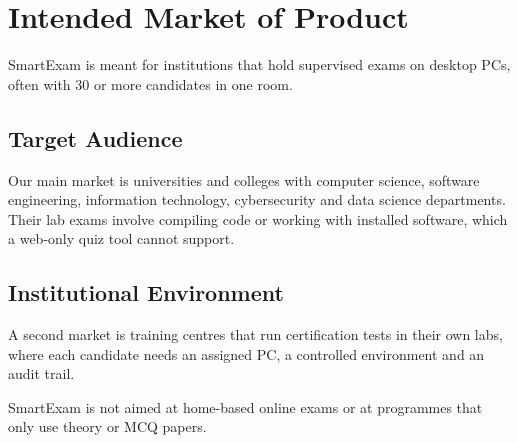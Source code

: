 \section{Intended Market of Product}

SmartExam is meant for institutions that hold supervised exams on desktop PCs, often with 30 or more candidates in one room.

\subsection{Target Audience}
Our main market is universities and colleges with computer science, software engineering, information technology, cybersecurity and data science departments. Their lab exams involve compiling code or working with installed software, which a web-only quiz tool cannot support.

\subsection{Institutional Environment}
A second market is training centres that run certification tests in their own labs, where each candidate needs an assigned PC, a controlled environment and an audit trail.

SmartExam is not aimed at home-based online exams or at programmes that only use theory or MCQ papers.
